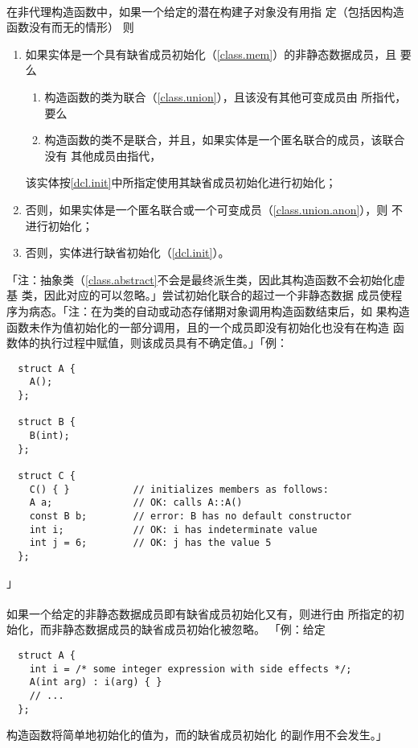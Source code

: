 \paragraph{}
在非代理构造函数中，如果一个给定的潜在构建子对象没有用指
定（包括因构造函数没有而无的情形）
则
\begin{enumerate}
  \item{如果实体是一个具有缺省成员初始化（\ref{class.mem}）的非静态数据成员，且
    要么
    \begin{enumerate}
      \item{构造函数的类为联合（\ref{class.union}），且该没有其他可变成员由
        所指代，要么}
      \item{构造函数的类不是联合，并且，如果实体是一个匿名联合的成员，该联合没有
        其他成员由指代，}
    \end{enumerate}
    该实体按\ref{dcl.init}中所指定使用其缺省成员初始化进行初始化；}
  \item{否则，如果实体是一个匿名联合或一个可变成员（\ref{class.union.anon}），则
    不进行初始化；}
  \item{否则，实体进行缺省初始化（\ref{dcl.init}）。}
\end{enumerate}
「注：抽象类（\ref{class.abstract}不会是最终派生类，因此其构造函数不会初始化虚基
类，因此对应的可以忽略。」尝试初始化联合的超过一个非静态数据
成员使程序为病态。「注：在为类的自动或动态存储期对象调用构造函数结束后，如
果构造函数未作为值初始化的一部分调用，且的一个成员即没有初始化也没有在构造
函数体的执行过程中赋值，则该成员具有不确定值。」「例：
\begin{lstlisting}
  struct A {
    A();
  };

  struct B {
    B(int);
  };

  struct C {
    C() { }           // initializes members as follows:
    A a;              // OK: calls A::A()
    const B b;        // error: B has no default constructor
    int i;            // OK: i has indeterminate value
    int j = 6;        // OK: j has the value 5
  };
\end{lstlisting}」

\paragraph{}
如果一个给定的非静态数据成员即有缺省成员初始化又有，则进行由
所指定的初始化，而非静态数据成员的缺省成员初始化被忽略。
「例：给定
\begin{lstlisting}
  struct A {
    int i = /* some integer expression with side effects */;
    A(int arg) : i(arg) { }
    // ...
  };
\end{lstlisting}
构造函数将简单地初始化的值为，而的缺省成员初始化
的副作用不会发生。」

